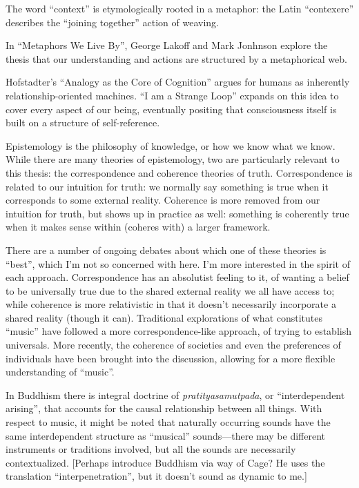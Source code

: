 \documentclass{thesis}
\begin{document}
The word ``context'' is etymologically rooted in a metaphor: the Latin ``contexere'' describes the ``joining together'' action of weaving.

In ``Metaphors We Live By'', George Lakoff and Mark Jonhnson explore the thesis that our understanding and actions are structured by a metaphorical web.

Hofstadter's ``Analogy as the Core of Cognition''\cite{Hofstadter01} argues for humans as inherently relationship-oriented machines. ``I am a Strange Loop''\cite{Hofstadter07} expands on this idea to cover every aspect of our being, eventually positing that consciousness itself is built on a structure of self-reference.

Epistemology is the philosophy of knowledge, or how we know what we know.\cite{Blackburn07} While there are many theories of epistemology, two are particularly relevant to this thesis: the correspondence\cite{david_correspondence_????} and coherence\cite{young_coherence_????} theories of truth. Correspondence is related to our intuition for truth: we normally say something is true when it corresponds to some external reality. Coherence is more removed from our intuition for truth, but shows up in practice as well: something is coherently true when it makes sense within (coheres with) a larger framework.
	
There are a number of ongoing debates about which one of these theories is ``best'', which I'm not so concerned with here. I'm more interested in the spirit of each approach. Correspondence has an absolutist feeling to it, of wanting a belief to be universally true due to the shared external reality we all have access to; while coherence is more relativistic in that it doesn't necessarily incorporate a shared reality (though it can). Traditional explorations of what constitutes ``music'' have followed a more correspondence-like approach, of trying to establish universals. More recently, the coherence of societies and even the preferences of individuals have been brought into the discussion, allowing for a more flexible understanding of ``music''.

In Buddhism there is integral doctrine of \emph{pratityasamutpada}, or ``interdependent arising'', that accounts for the causal relationship between all things.\cite{Koller01} With respect to music, it might be noted that naturally occurring sounds have the same interdependent structure as ``musical'' sounds---there may be different instruments or traditions involved, but all the sounds are necessarily contextualized. [Perhaps introduce Buddhism via way of Cage? He uses the translation ``interpenetration'', but it doesn't sound as dynamic to me.]
\end{document}
